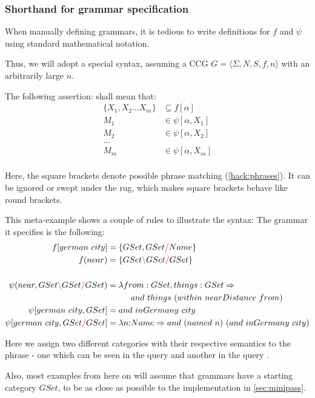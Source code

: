\documentclass[main.tex]{subfiles}
\begin{document}
\subsubsection{Shorthand for grammar specification}
\label{shorthand}
When manually defining grammars, it is tedious to write definitions
for $f$ and $\psi$ using standard mathematical notation.

Thus, we will adopt a special syntax, assuming a CCG
$G = \langle \Sigma, N, S, f, n \rangle$ with an arbitrarily large $n$.

The following assertion:
shall mean that:
\begin{align*}
    \{ X_1, X_2 ... X_m \} & \subseteq f[\alpha] \\
    M_1 & \in \psi[\alpha, X_1] \\
    M_2 & \in \psi[\alpha, X_2] \\
    ... & \\
    M_m & \in \psi[\alpha, X_m] \\
\end{align*}

Here, the square brackets denote possible phrase matching (\cref{hack:phrases}). It can
be ignored or swept under the rug, which makes square brackets behave like
round brackets.

\begin{example}
    This meta-example shows a couple of rules to illustrate the syntax:
    The grammar it specifies is the following:
    \begin{align*}
        f[german \text{ } city] &= \{ GSet, GSet \textcolor{red}{/} Name \} \\
        f(near) &= \{ GSet \textcolor{red}{\backslash} GSet \textcolor{red}{/} GSet \} \\
        \\
        \psi(near, GSet \textcolor{red}{\backslash} GSet \textcolor{red}{/} GSet) &= \lambda from: GSet, things: GSet \Rightarrow \\
        & \phantom{=} \qquad and \text{ } things \text{ } (within \text{ } nearDistance \text{ } from) \\
        \psi[german \text{ } city, GSet] &= and \text{ } inGermany \text{ } city \\
        \psi[german \text{ } city, GSet \textcolor{red}{/} GSet] &= \lambda n{:} Name \Rightarrow and \text{ } (named \text{ } n) \text{ } (and \text{ } inGermany \text{ } city) \\
     \end{align*}

     Here we assign two different categories with their respective semantics
     to the phrase  - one which can be seen in the query
      and another in the query
     .
 \end{example}

Also, most examples from here on will assume that grammars have a starting
category $GSet$, to be as close as possible to the implementation in
\cref{sec:minipass}.
\end{document}
